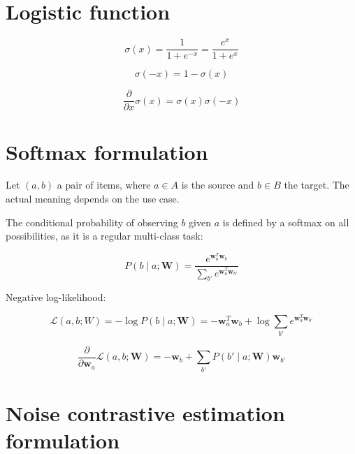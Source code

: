 \documentclass[a4paper,oneside,12pt]{article}
\begin{document}


\section{Logistic function}

\begin{equation}
\sigma (x) = \frac{1}{1 + e^{-x}} = \frac{e^x}{1 + e^x}
\end{equation}

\begin{equation}
\sigma (-x) = 1 - \sigma (x)
\end{equation}

\begin{equation}
\frac{\partial}{\partial x} \sigma (x) = \sigma (x) \sigma (-x)
\end{equation}


\section{Softmax formulation}

Let $(a, b)$ a pair of items, where $a \in A$ is the source and $b \in B$ the target. The actual meaning depends on the use case.

The conditional probability of observing $b$ given $a$ is defined by a softmax on all possibilities, as it is a regular multi-class task:

\begin{equation}
P(b \mid a ; \mathbf{W}) = \frac{e^{\mathbf{w}_a^T \mathbf{w}_b}}{\sum_{b'} e^{\mathbf{w}_a^T \mathbf{w}_{b'}}}
\end{equation}

Negative log-likelihood:

\begin{equation}
\mathcal{L} (a, b ; W) = -\log P(b \mid a ; \mathbf{W}) = -\mathbf{w}_a^T \mathbf{w}_b + \log \sum_{b'} e^{\mathbf{w}_a^T \mathbf{w}_{b'}}
\end{equation}

\begin{equation}
\frac{\partial}{\partial \mathbf{w}_a} \mathcal{L} (a, b ; \mathbf{W}) = -\mathbf{w}_b + \sum_{b'} P(b' \mid a ; \mathbf{W}) \mathbf{w}_{b'}
\end{equation}


\section{Noise contrastive estimation formulation}
\end{document}
